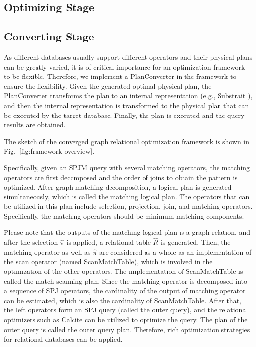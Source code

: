 \subsection{Optimizing Stage}

\subsection{Converting Stage}

As different databases usually support different operators and their physical plans can be greatly varied, it is of critical importance for an optimization framework to be flexible.
Therefore, we implement a PlanConverter in the framework to ensure the flexibility.
Given the generated optimal physical plan, the PlanConverter transforms the plan to an internal representation (e.g., Substrait \cite{substrait}), and then the internal representation is transformed to the physical plan that can be executed by the target database.
Finally, the plan is executed and the query results are obtained.

The sketch of the converged graph relational optimization framework is shown in Fig.~\ref{fig:framework-overview}.

Specifically, given an SPJM query with several matching operators, the matching operators are first decomposed and the order of joins to obtain the pattern is optimized.
After graph matching decomposition, a logical plan is generated simultaneously, which is called the matching logical plan.
The operators that can be utilized in this plan include selection, projection, join, and matching operators.
Specifically, the matching operators should be minimum matching components.

Please note that the outputs of the matching logical plan is a graph relation, and after the selection $\widehat{\pi}$ is applied, a relational table $\widehat{R}$ is generated.
Then, the matching operator as well as $\widehat{\pi}$ are considered as a whole as an implementation of the scan operator (named ScanMatchTable), which is involved in the optimization of the other operators.
The implementation of ScanMatchTable is called the match scanning plan.
Since the matching operator is decomposed into a sequence of SPJ operators, the cardinality of the output of matching operator can be estimated, which is also the cardinality of ScanMatchTable.
After that, the left operators form an SPJ query (called the outer query), and the relational optimizers such as Calcite can be utilized to optimize the query.
The plan of the outer query is called the outer query plan.
Therefore, rich optimization strategies for relational databases can be applied.

